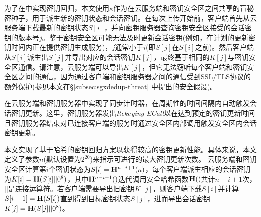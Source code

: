 为了在\sysnameS 中实现密钥回归，本文使用$\kappa$作为在云服务端和密钥安全区之间共享的盲秘密种子，用于派生新的密钥状态和会话密钥。在每次上传开始前，客户端首先从云服务端下载最新的密钥状态$S[i]$，并向密钥服务器查询密钥安全区接受的会话密钥的版本号$j$。鉴于密钥安全区可能无法及时更新会话密钥(例如，在计划的更新密钥时间内正在提供密钥生成服务)，$j$通常小于$i$(即$S[j]$在$S[i]$之前)。然后客户端从$S[i]$派生出$S[j]$并导出对应的会话密钥$K[j]$，最终基于相同的$K[j]$与密钥安全区通信。请注意，云服务端可以导出$K[j]$，但它无法窃听每个客户端和密钥安全区之间的通信，因为通过客户端和密钥服务器之间的通信受到SSL/TLS协议的额外保护(参见本文在\S\ref{subsec:sgxdedup-threat} 中提出的安全假设)。

\sysnameS 在云服务端和密钥服务器中实现了同步计时器，在周期性的时间间隔内自动触发会话密钥更新。这里，密钥服务器发出\textit{Rekeying ECall}以在达到预定的密钥更新时间且密钥服务器结束对已连接客户端的服务时通过安全区内部调用触发安全区内会话密钥更新。

本文实现了基于哈希的密钥回归方案\cite{fu06}以获得较高的密钥更新性能。具体来说，本文定义了参数$n$(默认设置为$2^{20}$\cite{fu06})来指示可进行的最大密钥更新次数。 云服务端和密钥安全区计算第$i$个密钥状态为$S[i] = {\bf H}^{n-i+1}(\kappa)$，每个客户端派生相应的会话密钥为$K[i] = {\bf H}(S[i] || 0^8)$，其中${\bf H}^{n-i+1}()$迭代调用安全哈希函数${\bf H}()$共计$n-i+1$次，$||$是连接运算符。若客户端需要导出旧密钥$K[j]$，则客户端下载$S[i]$并计算$S[i-1] = {\bf H}(S[i])$直到得到目标密钥状态$S[j]$，进而导出会话密钥$K[j] = {\bf H}(S[j] || 0^8)$。
